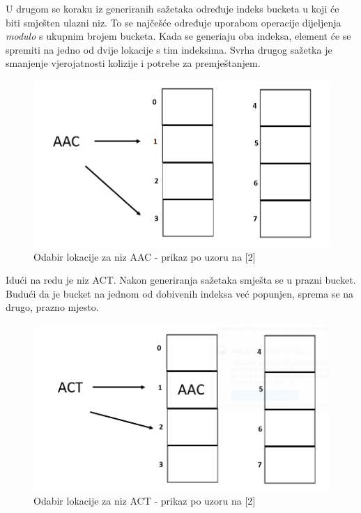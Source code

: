 \documentclass[times, utf8, seminar, numeric]{fer}
\begin{document}
U drugom se koraku iz generiranih sažetaka određuje indeks bucketa u koji će biti smješten ulazni niz. To se najčešće određuje uporabom operacije dijeljenja \textit{modulo} s ukupnim brojem bucketa. Kada se generiaju oba indeksa, element će se spremiti na jedno od dvije lokacije s tim indeksima. Svrha drugog sažetka je smanjenje vjerojatnosti kolizije i potrebe za premještanjem. 


\begin{figure}[H]
  \centering
  \setlength{\intextsep}{5pt}
  \includegraphics[scale = 0.4]{images/insertion1.png}
  \caption{Odabir lokacije za niz AAC - prikaz po uzoru na [2]}
  \label{fig_insert1}
\end{figure}
Idući na redu je niz ACT. Nakon generiranja sažetaka smješta se u prazni bucket. Budući da je bucket na jednom od dobivenih indeksa već popunjen, sprema se na drugo, prazno mjesto.
\begin{figure}[H]
  \centering
  \setlength{\intextsep}{5pt}
  \includegraphics[scale = 0.4]{images/insertion2.png}
  \caption{Odabir lokacije za niz ACT - prikaz po uzoru na [2]}
  \label{fig_insert2}
\end{figure}
\end{document}
